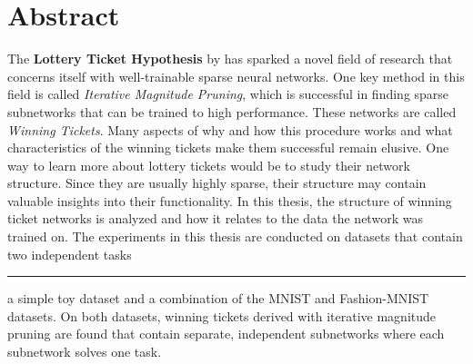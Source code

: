 \chapter*{Abstract}

The \textbf{Lottery Ticket Hypothesis} by \textcite{LTH} has sparked a novel field of research that concerns itself with well-trainable sparse neural networks.
One key method in this field is called \textit{Iterative Magnitude Pruning}, which is successful in finding sparse subnetworks that can be trained to high performance. These networks are called \textit{Winning Tickets}.
Many aspects of why and how this procedure works and what characteristics of the winning tickets make them successful remain elusive.
One way to learn more about lottery tickets would be to study their network structure.
Since they are usually highly sparse, their structure may contain valuable insights into their functionality.
In this thesis, the structure of winning ticket networks is analyzed and how it relates to the data the network was trained on.
The experiments in this thesis are conducted on datasets that contain two independent tasks \rule[0.5ex]{.5em}{0.5pt} a simple toy dataset and a combination of the MNIST and Fashion-MNIST datasets.
On both datasets, winning tickets derived with iterative magnitude pruning are found that contain separate, independent subnetworks where each subnetwork solves one task.
